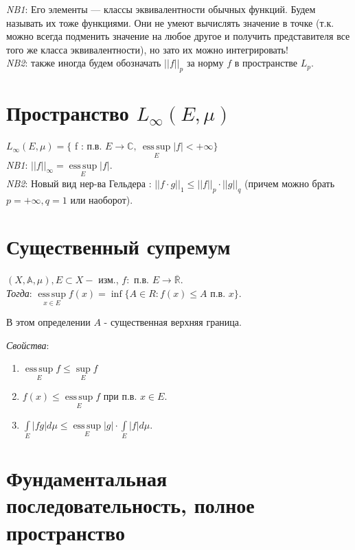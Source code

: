 \documentclass[paper=a4, fontsize=17pt]{article}
\DeclareMathOperator*{\esssup}{ess\, sup}
\begin{document}
	\emph{NB1}: Его элементы --- классы эквивалентности обычных функций. Будем называть их тоже функциями. Они не умеют вычислять значение в точке (т.к. можно всегда подменить значение на любое другое и получить представителя все того же класса эквивалентности), но зато их можно интегрировать!\\
	
	\emph{NB2}: также иногда будем обозначать $||f||_p$ за норму $f$ в пространстве $L_p$.
	
	\section{Пространство $L_{\infty}(E,\mu)$}
	$L_\infty(E, \mu) =\{$ f : п.в. $E \rightarrow \mathbb{C},\ \esssup\limits_E |f| < +\infty \}$\\
	\emph{NB1}: $||f||_\infty = \esssup\limits_E |f|$.\\
	
	\emph{NB2}: Новый вид нер-ва Гельдера : $||f \cdot g||_1 \leq ||f||_p \cdot ||g||_q$ (причем можно брать $p = +\infty, q = 1$ или наоборот).
	
	\section{Существенный супремум}
	$(X, \mathds{A}, \mu), E \subset X - $ изм., $f : $ п.в. $E \rightarrow \overline{\mathbb{R}}$.\\
	
	\emph{Тогда}: $\esssup\limits_{x \in E} f(x) = \inf \{A \in R : f(x) \leq A$ п.в. $x \}$. 
	
	В этом определении $A$ - существенная верхняя граница. 
	
	\emph{Свойства}:
	\begin{enumerate}
		\item
		$\esssup\limits_E f \leq \sup\limits_E f$
		
		\item
		$f(x) \leq \esssup\limits_E f$ при п.в. $x \in E$.
		
		\item
		$\int\limits_E |fg|d\mu \leq \esssup\limits_E |g| \cdot \int\limits_E |f|d\mu$.
	\end{enumerate}
	
	\section{Фундаментальная последовательность, полное пространство}
	
\end{document}
